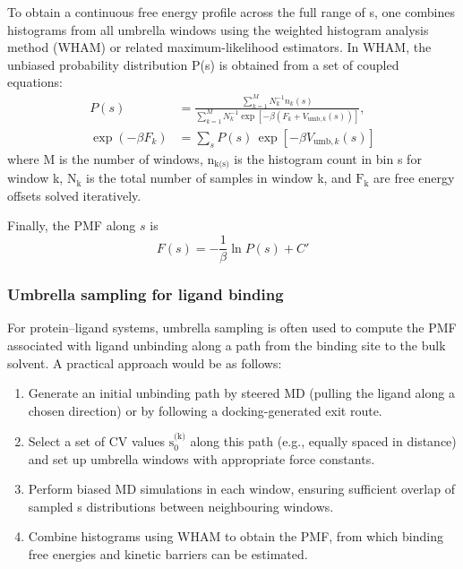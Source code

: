\documentclass[12pt]{article}
\begin{document}
To obtain a continuous free energy profile across the full range of s, one combines histograms from all umbrella windows using the weighted histogram analysis method (WHAM) or related maximum-likelihood estimators\cite{CH9_Kumar1992,CH9_Roux1995}. In WHAM, the unbiased probability distribution P(s) is obtained from a set of coupled equations:
\begin{align}
P(s) &= \frac{\sum_{k=1}^{M} N_k^{-1} n_k(s)}{\sum_{k=1}^{M} N_k^{-1} \exp\left[-\beta \left(F_k + V_{\text{umb},k}(s)\right)\right]}, \\
\exp(-\beta F_k) &= \sum_{s} P(s)\,\exp\left[-\beta V_{\text{umb},k}(s)\right]
\end{align}
where M is the number of windows, $\textrm{n}_\textrm{k(s)}$ is the histogram count in bin s for window k, $\textrm{N}_\textrm{k}$ is the total number of samples in window k, and $\textrm{F}_\textrm{k}$ are free energy offsets solved iteratively.

Finally, the PMF along $s$ is
\begin{equation}
F(s) = -\frac{1}{\beta}\ln P(s) + C'
\end{equation}

\subsubsection{Umbrella sampling for ligand binding}

For protein--ligand systems, umbrella sampling is often used to compute the PMF associated with ligand unbinding along a path from the binding site to the bulk solvent\cite{CH9_TorrieValleau1977,CH9_Roux1995,CH9_Kastner2011}. A practical approach would be as follows:

\begin{enumerate}
\item Generate an initial unbinding path by steered MD (pulling the ligand along a chosen direction) or by following a docking-generated exit route.
\item Select a set of CV values $\textrm{s}_\textrm{0}^{\textrm{(k)}}$ along this path (e.g., equally spaced in distance) and set up umbrella windows with appropriate force constants.
\item Perform biased MD simulations in each window, ensuring sufficient overlap of sampled s distributions between neighbouring windows.
\item Combine histograms using WHAM to obtain the PMF, from which binding free energies and kinetic barriers can be estimated.
\end{enumerate}
\end{document}
